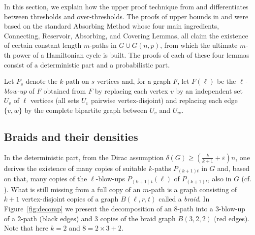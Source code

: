 \documentclass[reqno, 12pt]{amsart}
\numberwithin{equation}{section}
\numberwithin{figure}{section}
\let\epsilon=\varepsilon
\let\eps=\epsilon
\theoremstyle{plain}
\theoremstyle{definition}
\begin{document}
In this section, we explain how the upper proof technique from \cite{ADRRS} and \cite{ADR} differentiates between thresholds and over-thresholds. The proofs of upper bounds in \cite{ADRRS} and \cite{ADR} were based on the standard Absorbing Method whose four main ingredients, Connecting, Reservoir, Absorbing, and Covering Lemmas, all claim the existence of certain constant length $m$-paths in $G\cup G(n,p)$, from which the ultimate $m$-th power of a Hamiltonian cycle is built. The proofs of each of these four lemmas consist of a deterministic part and a probabilistic part.

Let $P_s$ denote the $k$-path on $s$ vertices and, for a graph $F$, let $F(\ell)$ be the \emph{$\ell$-blow-up} of $F$ obtained from $F$ by replacing each vertex $v$ by an independent set $U_v$ of $\ell$ vertices (all sets $U_v$ pairwise vertex-disjoint) and replacing each edge $\{v,w\}$ by the complete bipartite graph between $U_v$ and $U_w$.


\subsection{Braids and their densities}\label{bra}

In the deterministic part, from the Dirac assumption $\delta(G)\ge \left(\tfrac k{k+1}+\eps\right)n$, one derives the existence of many copies of suitable $k$-paths $P_{(k+1)t}$ in $G$ and, based on that, many copies of the $\ell$-blow-ups $P_{(k+1)t}(\ell)$ of $P_{(k+1)t}$, also in $G$ (cf. \cite[Lemma 5.15]{ADRRS}). What is still missing from a full copy of an $m$-path is a graph consisting of $k+1$ vertex-disjoint copies of a graph $B(\ell,r,t)$ called a \emph{braid}.
In Figure~\ref{fig:decomp} we present the decomposition of an 8-path into a 3-blow-up of a 2-path (black edges) and 3 copies of the braid graph $B(3,2,2)$ (red edges). Note that here $k=2$ and $8=2\times3+2$.
\end{document}
